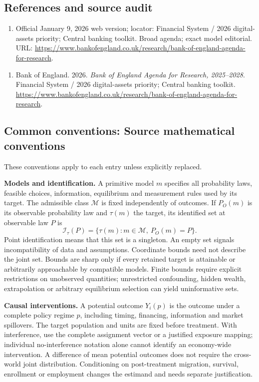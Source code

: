 \documentclass[11pt,a4paper]{article}
\begin{document}
\subsection*{References and source audit}
\begin{enumerate}
\item Official January 9, 2026 web version; locator: Financial System / 2026 digital-assets priority; Central banking toolkit. Broad agenda; exact model editorial. URL: \url{https://www.bankofengland.co.uk/research/bank-of-england-agenda-for-research}.
\end{enumerate}
\begin{enumerate}\raggedright
\item\hypertarget{definitions:source:30007611:1}{} Bank of England. 2026. \emph{Bank of England Agenda for Research, 2025–2028}. Financial System / 2026 digital-assets priority; Central banking toolkit.
\url{https://www.bankofengland.co.uk/research/bank-of-england-agenda-for-research}.
\end{enumerate}

\subsection*{Common conventions: Source mathematical conventions}

These conventions apply to each entry unless explicitly replaced.

\textbf{Models and identification.} A primitive model \(m\) specifies all probability laws, feasible choices, information, equilibrium and measurement rules used by its target. The admissible class \(\mathcal M\) is fixed independently of outcomes. If \(P_O(m)\) is its observable probability law and \(\tau(m)\) the target, its identified set at observable law \(P\) is
\[
 \mathcal I_\tau(P)=\{\tau(m):m\in\mathcal M,\ P_O(m)=P\}.
\]
Point identification means that this set is a singleton. An empty set signals incompatibility of data and assumptions. Coordinate bounds need not describe the joint set. Bounds are sharp only if every retained target is attainable or arbitrarily approachable by compatible models. Finite bounds require explicit restrictions on unobserved quantities; unrestricted confounding, hidden wealth, extrapolation or arbitrary equilibrium selection can yield uninformative sets.

\textbf{Causal interventions.} A potential outcome \(Y_i(p)\) is the outcome under a complete policy regime \(p\), including timing, financing, information and market spillovers. The target population and units are fixed before treatment. With interference, use the complete assignment vector or a justified exposure mapping; individual no-interference notation alone cannot identify an economy-wide intervention. A difference of mean potential outcomes does not require the cross-world joint distribution. Conditioning on post-treatment migration, survival, enrollment or employment changes the estimand and needs separate justification.
\end{document}
